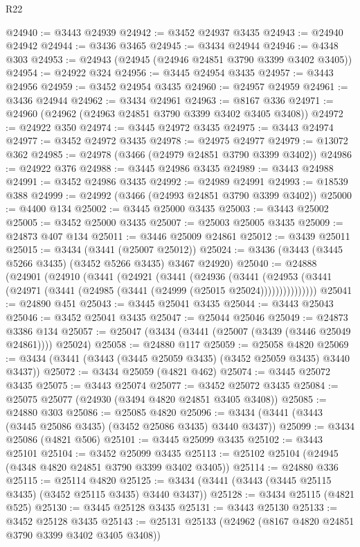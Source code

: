 \begin{lexlean}{R22}
\begin{coremodule}
@24940 := @3443 @24939
@24942 := @3452 @24937 @3435
@24943 := @24940 @24942
@24944 := @3436 @3465
@24945 := @3434 @24944
@24946 := @4348 @303
@24953 := @24943 (@24945 (@24946 @24851 @3790 @3399 @3402 @3405))
@24954 := @24922 @324
@24956 := @3445 @24954 @3435
@24957 := @3443 @24956
@24959 := @3452 @24954 @3435
@24960 := @24957 @24959
@24961 := @3436 @24944
@24962 := @3434 @24961
@24963 := @8167 @336
@24971 := @24960 (@24962 (@24963 @24851 @3790 @3399 @3402 @3405 @3408))
@24972 := @24922 @350
@24974 := @3445 @24972 @3435
@24975 := @3443 @24974
@24977 := @3452 @24972 @3435
@24978 := @24975 @24977
@24979 := @13072 @362
@24985 := @24978 (@3466 (@24979 @24851 @3790 @3399 @3402))
@24986 := @24922 @376
@24988 := @3445 @24986 @3435
@24989 := @3443 @24988
@24991 := @3452 @24986 @3435
@24992 := @24989 @24991
@24993 := @18539 @388
@24999 := @24992 (@3466 (@24993 @24851 @3790 @3399 @3402))
@25000 := @4400 @134
@25002 := @3445 @25000 @3435
@25003 := @3443 @25002
@25005 := @3452 @25000 @3435
@25007 := @25003 @25005 @3435
@25009 := @24873 @407 @134
@25011 := @3446 @25009 @24861
@25012 := @3439 @25011
@25015 := @3434 (@3441 (@25007 @25012))
@25024 := @3436 (@3443 (@3445 @5266 @3435) (@3452 @5266 @3435) @3467 @24920)
@25040 := @24888
    (@24901
      (@24910
        (@3441
          (@24921
            (@3441
              (@24936
                (@3441
                  (@24953 (@3441 (@24971 (@3441 (@24985 (@3441 (@24999 (@25015 @25024)))))))))))))))
@25041 := @24890 @451
@25043 := @3445 @25041 @3435
@25044 := @3443 @25043
@25046 := @3452 @25041 @3435
@25047 := @25044 @25046
@25049 := @24873 @3386 @134
@25057 := @25047 (@3434 (@3441 (@25007 (@3439 (@3446 @25049 @24861)))) @25024)
@25058 := @24880 @117
@25059 := @25058 @4820
@25069 := @3434 (@3441 (@3443 (@3445 @25059 @3435) (@3452 @25059 @3435) @3440 @3437))
@25072 := @3434 @25059 (@4821 @462)
@25074 := @3445 @25072 @3435
@25075 := @3443 @25074
@25077 := @3452 @25072 @3435
@25084 := @25075 @25077 (@24930 (@3494 @4820 @24851 @3405 @3408))
@25085 := @24880 @303
@25086 := @25085 @4820
@25096 := @3434 (@3441 (@3443 (@3445 @25086 @3435) (@3452 @25086 @3435) @3440 @3437))
@25099 := @3434 @25086 (@4821 @506)
@25101 := @3445 @25099 @3435
@25102 := @3443 @25101
@25104 := @3452 @25099 @3435
@25113 := @25102 @25104 (@24945 (@4348 @4820 @24851 @3790 @3399 @3402 @3405))
@25114 := @24880 @336
@25115 := @25114 @4820
@25125 := @3434 (@3441 (@3443 (@3445 @25115 @3435) (@3452 @25115 @3435) @3440 @3437))
@25128 := @3434 @25115 (@4821 @525)
@25130 := @3445 @25128 @3435
@25131 := @3443 @25130
@25133 := @3452 @25128 @3435
@25143 := @25131 @25133 (@24962 (@8167 @4820 @24851 @3790 @3399 @3402 @3405 @3408))

\end{coremodule}
\end{lexlean}
